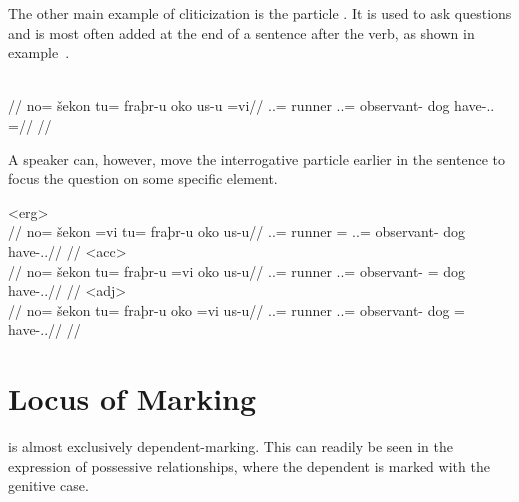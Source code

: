 The other main example of cliticization is the particle . It is used to ask questions and is most often added at the end of a sentence after the verb, as shown in example~.

	\begingl
		\glpreamble{}\\
		//
		\gla no= šekon tu= fraþr-u oko us-u =vi//
		\glb \An.\Sg.\Top{}= runner \An.\Sg.\Acc{}= observant-\An{} dog have-\Ind.\Npst.\Ipfv{} =\Int//
		\glft {}//
	\endgl
\xe

A speaker can, however, move the interrogative particle earlier in the sentence to focus the question on some specific element.

	\a<erg>\begingl
		\glpreamble{}\\
		//
		\gla no= šekon =vi tu= fraþr-u oko us-u//
		\glb \An.\Sg.\Top{}= runner =\Int{} \An.\Sg.\Acc{}= observant-\An{} dog have-\Ind.\Npst.\Ipfv//
		\glft {}//
	\endgl
	\a<acc>\begingl
		\glpreamble{}\\
		//
		\gla no= šekon tu= fraþr-u =vi oko us-u//
		\glb \An.\Sg.\Top{}= runner \An.\Sg.\Acc{}= observant-\An{} =\Int{} dog have-\Ind.\Npst.\Ipfv//
		\glft {}//
	\endgl
	\a<adj>\begingl
		\glpreamble{}\\
		//
		\gla no= šekon tu= fraþr-u oko =vi us-u//
		\glb \An.\Sg.\Top{}= runner \An.\Sg.\Acc{}= observant-\An{} dog =\Int{} have-\Ind.\Npst.\Ipfv//
		\glft {}//
	\endgl
\xe


\section{Locus of Marking}
\label{sec:tvk-locus}

\langtvk{} is almost exclusively dependent-marking\autocite{wals-25}. This can readily be seen in the expression of possessive relationships, where the dependent is marked with the genitive case.

